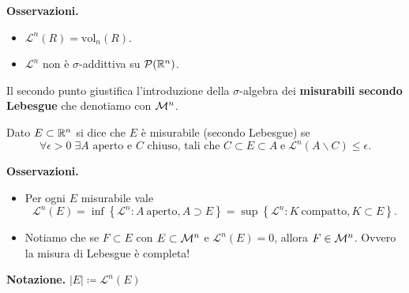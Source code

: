 \textbf{Osservazioni.}
\begin{itemize}
	\item $\mathscr L^n(R) = \mathrm{vol}_n (R)$.

	\item $\mathscr L^n$ non è $\sigma $-addittiva su $\mathcal{P}(\mathbb R^n)$.
\end{itemize}

Il secondo punto giustifica l'introduzione della $\sigma $-algebra dei \textbf{misurabili secondo Lebesgue} che denotiamo con $\mathcal{M}^n$.

Dato $E \subset \mathbb R^n$ si dice che $E$ è misurabile (secondo Lebesgue) se
$$
\forall \epsilon > 0 \; \exists A \text{ aperto e } C \text{ chiuso, tali che }
C \subset E \subset A \; \text{e} \; \mathscr L^n (A \smallsetminus C) \leq \epsilon.
$$

\textbf{Osservazioni.}
\begin{itemize}
	\item Per ogni $E$ misurabile vale
$$
	\mathscr L^n(E) = \inf \left\{ \mathscr L^n \colon A \ \text{aperto}, A \supset E \right\} = \sup \left\{ \mathscr L^n \colon K \ \text{compatto}, K \subset E \right\}.
$$
	\item Notiamo che se $F \subset E$ con $E \subset \mathcal{M}^n$ e $\mathscr L^n(E) = 0$, allora $F \in \mathcal{M}^n$. Ovvero la misura di Lebesgue è completa!
\end{itemize}

\textbf{Notazione.} $\left| E \right| \coloneqq \mathscr L^n (E)$
